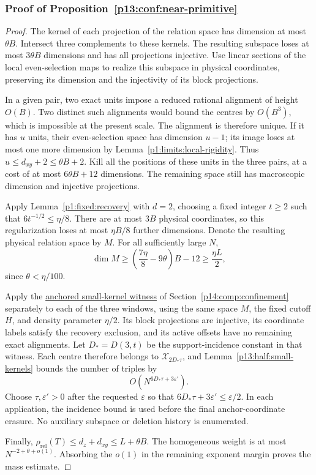 \subsubsection{Proof of Proposition~\ref{p13:conf:near-primitive}}
\label{p14:comp:confinement:near}

\begin{proof}
The kernel of each projection of the relation space
has dimension at most \(\theta B\).
Intersect three complements to these kernels.
The resulting subspace loses at most \(3\theta B\)
dimensions and has all projections injective.
Use linear sections of the local even-selection maps to realize
this subspace in physical coordinates, preserving its dimension
and the injectivity of its block projections.

In a given pair, two exact units impose a reduced rational
alignment of height \(O(B)\). Two distinct such alignments
would bound the centres by \(O(B^3)\), which is impossible
at the present scale. The alignment is therefore unique.
If it has \(u\) units, their even-selection space has
dimension \(u-1\); its image loses at most one more
dimension by Lemma~\ref{p1:limits:local-rigidity}.
Thus \(u\le d_{xy}+2\le\theta B+2\).
Kill all the positions of these units in the three pairs,
at a cost of at most \(6\theta B+12\) dimensions.
The remaining space still has macroscopic dimension
and injective projections.

Apply Lemma~\ref{p1:fixed:recovery} with \(d=2\), choosing a fixed
integer \(t\ge2\) such that \(6t^{-1/2}\le\eta/8\).
There are at most \(3B\) physical coordinates, so this regularization
loses at most \(\eta B/8\) further dimensions. Denote the resulting
physical relation space by \(M\). For all sufficiently large \(N\),
\[
 \dim M\ge
 \left(\frac{7\eta}{8}-9\theta\right)B-12
 \ge\frac{\eta L}{2},
\]
since \(\theta<\eta/100\).

Apply the
\hyperref[p18:conf:anchored]{anchored small-kernel witness}
of Section~\ref{p14:comp:confinement} separately to each of the
three windows, using the same space \(M\), the fixed cutoff \(H\),
and density parameter \(\eta/2\).
Its block projections are injective, its coordinate labels satisfy
the recovery exclusion, and its active offsets have no remaining
exact alignments. Let \(D_*=D(3,t)\) be the support-incidence
constant in that witness. Each centre therefore belongs to
\(\mathcal X_{2D_*\tau}\), and
Lemma~\ref{p13:half:small-kernels} bounds the number of triples by
\[
 O\!\left(N^{6D_*\tau+3\varepsilon'}\right).
\]
Choose \(\tau,\varepsilon'>0\) after the requested \(\varepsilon\)
so that \(6D_*\tau+3\varepsilon'\le\varepsilon/2\).
In each application, the incidence bound is used before the final
anchor-coordinate erasure. No auxiliary subspace or deletion
history is enumerated.

Finally,
\(\rho_{\mathrm{rel}}(T)\le d_z+d_{xy}\le L+\theta B\).
The homogeneous weight is at most
\(N^{-2+\theta+o(1)}\). Absorbing the \(o(1)\) in the remaining
exponent margin proves the mass estimate.
\end{proof}

